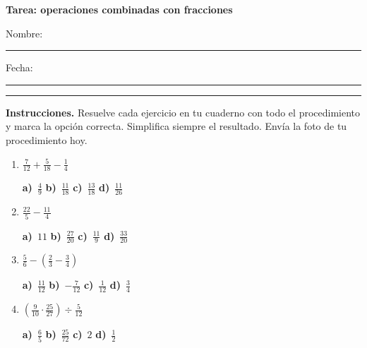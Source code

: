\documentclass[11pt,a4paper]{article}
\begin{document}
{\LARGE\bfseries Tarea: operaciones combinadas con fracciones}

\vspace{10pt}
Nombre: \rule{9cm}{0.4pt} \hfill Fecha: \rule{3.5cm}{0.4pt}

\vspace{10pt}
{\color{verde}\rule{\textwidth}{1pt}}

\vspace{4pt}
\textbf{Instrucciones.} Resuelve cada ejercicio en tu cuaderno con todo el procedimiento y marca la opción correcta. Simplifica siempre el resultado. Envía la foto de tu procedimiento hoy.

\vspace{10pt}
\begin{enumerate}[label=\textbf{\arabic*.},leftmargin=*,itemsep=14pt]
\item $\displaystyle \frac{7}{12}+\frac{5}{18}-\frac{1}{4}$

\vspace{6pt}
\noindent \textbf{a)}~$\displaystyle \frac{4}{9}$ \hfill \textbf{b)}~$\displaystyle \frac{11}{18}$ \hfill \textbf{c)}~$\displaystyle \frac{13}{18}$ \hfill \textbf{d)}~$\displaystyle \frac{11}{26}$
\vspace{10pt}

\item $\displaystyle \frac{22}{5}-\frac{11}{4}$

\vspace{6pt}
\noindent \textbf{a)}~$\displaystyle 11$ \hfill \textbf{b)}~$\displaystyle \frac{27}{20}$ \hfill \textbf{c)}~$\displaystyle \frac{11}{9}$ \hfill \textbf{d)}~$\displaystyle \frac{33}{20}$
\vspace{10pt}

\item $\displaystyle \frac{5}{6}-\left(\frac{2}{3}-\frac{3}{4}\right)$

\vspace{6pt}
\noindent \textbf{a)}~$\displaystyle \frac{11}{12}$ \hfill \textbf{b)}~$\displaystyle -\frac{7}{12}$ \hfill \textbf{c)}~$\displaystyle \frac{1}{12}$ \hfill \textbf{d)}~$\displaystyle \frac{3}{4}$
\vspace{10pt}

\item $\displaystyle \left(\frac{9}{10}\cdot\frac{25}{27}\right)\div\frac{5}{12}$

\vspace{6pt}
\noindent \textbf{a)}~$\displaystyle \frac{6}{5}$ \hfill \textbf{b)}~$\displaystyle \frac{25}{72}$ \hfill \textbf{c)}~$\displaystyle 2$ \hfill \textbf{d)}~$\displaystyle \frac{1}{2}$
\vspace{10pt}


\end{enumerate}
\end{document}
